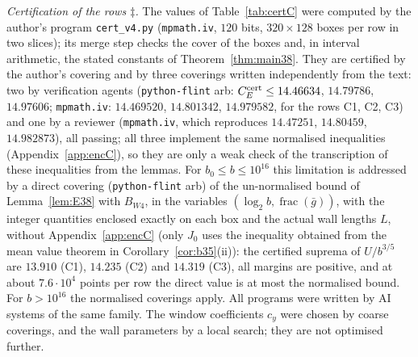 \documentclass[11pt]{amsart}
\theoremstyle{definition}
\theoremstyle{remark}
\numberwithin{equation}{section}
\begin{document}
\emph{Certification of the rows $\ddagger$.} The values of Table~\ref{tab:certC} were computed by the author's program
\texttt{cert\_v4.py} (\texttt{mpmath.iv}, $120$ bits, $320\times128$ boxes per row in two slices); its merge step checks the
cover of the boxes and, in interval arithmetic, the stated constants of Theorem~\ref{thm:main38}. They are certified by
the author's covering and by three coverings written independently from the text: two by verification agents
(\texttt{python-flint} arb: $C_E^{\rm cert}\le14.46634$, $14.79786$, $14.97606$; \texttt{mpmath.iv}: $14.469520$,
$14.801342$, $14.979582$, for the rows C1, C2, C3) and one by a reviewer (\texttt{mpmath.iv}, which reproduces $14.47251$,
$14.80459$, $14.982873$), all passing; all three implement the same normalised inequalities (Appendix~\ref{app:encC}),
so they are only a weak check of the transcription of these inequalities from the lemmas. For $b_0\le b\le10^{16}$ this
limitation is addressed by a direct covering (\texttt{python-flint} arb) of the un-normalised bound of Lemma~\ref{lem:E38}
with $B_{W4}$, in the variables $(\log_2b,\operatorname{frac}(\bar g))$, with the integer quantities enclosed exactly on each
box and the actual wall lengths $L$, without Appendix~\ref{app:encC} (only $J_0$ uses the inequality obtained from the mean
value theorem in Corollary~\ref{cor:b35}(ii)): the certified suprema of $U/b^{3/5}$ are $13.910$ (C1), $14.235$ (C2) and
$14.319$ (C3), all margins are positive, and at about $7.6\cdot10^4$ points per row the direct value is at most the
normalised bound. For $b>10^{16}$ the normalised coverings apply. All programs were written by AI systems of the same
family.
The window coefficients $c_y$ were chosen by coarse coverings, and the wall parameters by a local search; they are not
optimised further.
\end{document}

